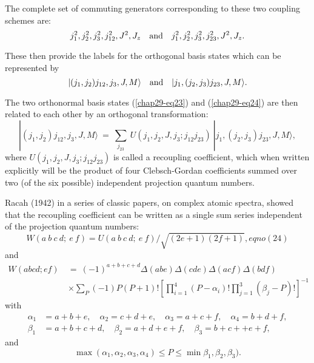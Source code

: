 The complete set of commuting generators corresponding to these two coupling schemes are:
\begin{equation}
j_1^2, j_2^2,j_3^2,j_{12}^2,J^2,J_z\quad {\rm and}\quad j_1^2, j_2^2,j_3^2,j_{23}^2,J^2,J_z. \label{chap29-eq23}
\end{equation}

These then provide the labels for the orthogonal basis states which can be represented by 
\begin{equation}
|(j_1,j_2)j_{12}, j_3, J, M\rangle  \quad {\rm and} \quad |j_1,(j_2,j_3)j_{23}, J, M\rangle. \label{chap29-eq24}
\end{equation}

The two orthonormal basis states (\eqref{chap29-eq23}) and (\eqref{chap29-eq24}) are then related to each other by an orthogonal transformation:
\begin{equation}
|(j_1,j_2)j_{12}, j_3, J, M\rangle \ =\ \sum_{j_{23}} \ U(j_1,j_2,J,j_3; j_{12}j_{23})\ |j_1,(j_2,j_3)j_{23}, J, M\rangle, \label{chap29-eq25}
\end{equation}
where $U(j_1,j_2,J,j_3; j_{12}j_{23})$ is called a recoupling coefficient, which 
when written explicitly will be the product of four Clebsch-Gordan coefficients summed
over two (of the six possible) independent projection quantum numbers.

Racah (1942) in a series of classic papers, on complex atomic spectra, showed 
that the recoupling coefficient can be written as a single sum series independent of 
the projection quantum numbers:
\begin{equation*}
W(a\ b\ c\ d;\ e\ f) =  U(a\ b\ c\ d;\ e\ f) / \sqrt{(2e+1)(2f+1)}, eqno(24)
\end{equation*}
and
\begin{equation*}
\begin{split}
W(abcd;ef)\ & =\ (-1)^{a+b+c+d} \Delta(abe)\Delta(cde)\Delta(acf)\Delta(bdf) \\
 & \times\sum_P(-1)P (P+1)!\left[ \prod_{i=1}^4 (P-\alpha_i)! \prod_{j=1}^3 (\beta_j-P)! \right]^{-1} \label{chap29-eq25a}
\end{split}
\end{equation*}
with
\begin{equation}
\begin{split}
\alpha_1 & = a+b+e,\quad \alpha_2 = c+d+e, \quad \alpha_3 = a+c+f,\quad \alpha_4 = b+d+f,\\
\beta_1 & = a+b+c+d,\quad \beta_2 = a+d+e+f, \quad \beta_3 = b+c++e+f, \label{chap29-eq26}
\end{split}
\end{equation}
and 
\begin{equation}
\max(\alpha_1,\alpha_2,\alpha_3,\alpha_4)\leq P\leq \min\beta_1,\beta_2,\beta_3). \label{chap29-eq27}
\end{equation}

